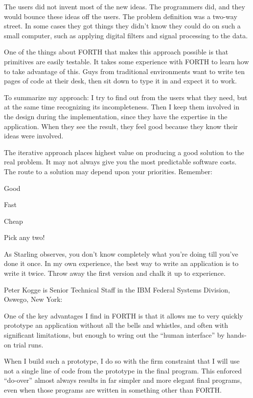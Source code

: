 \begin{interview}
\begin{tfquot}
The users did not invent most of the new ideas. The programmers did,
and they would bounce these ideas off the users. The problem
definition was a two-way street. In some cases they got things they
didn't know they could do on such a small computer, such as applying
digital filters and signal processing to the data.

One of the things about FORTH that makes this approach possible is
that primitives are easily testable. It takes some experience with
FORTH to learn how to take advantage of this. Guys from traditional
environments want to write ten pages of code at their desk, then sit
down to type it in and expect it to work.

To summarize my approach: I try to find out from the users what they
need, but at the same time recognizing its incompleteness. Then I keep
them involved in the design during the implementation, since they have the
expertise in the application.
When they see the result, they feel good because they know their ideas were
involved.

The iterative approach places highest value on producing a good solution to
the real problem. It may not always give you the most predictable software
costs. The route to a solution may depend upon your priorities. Remember:
\begin{list}{}{}
\item Good
\item Fast
\item Cheap
\end{list}
Pick any two!
\end{tfquot}
\end{interview}

\noindent As Starling observes, you don't know completely what you're doing till
you've done it once. In my own experience, the best way to write an
application is to write it twice. Throw away the first version and chalk it up
to experience.

\begin{interview}
\noindent Peter Kogge is Senior Technical Staff in the IBM Federal Systems
Division, Oswego, New York:

\begin{tfquot}
One of the key advantages I find in FORTH is that it allows
me to very quickly prototype an application without all the bells and
whistles, and often with significant limitations, but enough to wring
out the ``human interface'' by hands-on trial runs.

When I build such a prototype, I do so with the firm constraint that I
will use not a single line of code from the prototype in the final
program. This enforced ``do-over'' almost always results in far
simpler and more elegant final programs, even when those programs are
written in something other than FORTH.
\end{tfquot}
\end{interview}

